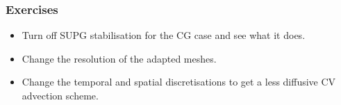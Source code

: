 \begin{frame}
  \frametitle{Exercises}
  \begin{itemize}
    \item Turn off SUPG stabilisation for the CG case and see what it does.
    \item Change the resolution of the adapted meshes.
    \item Change the temporal and spatial discretisations to get a less diffusive CV advection scheme.
  \end{itemize}
\end{frame}

%
